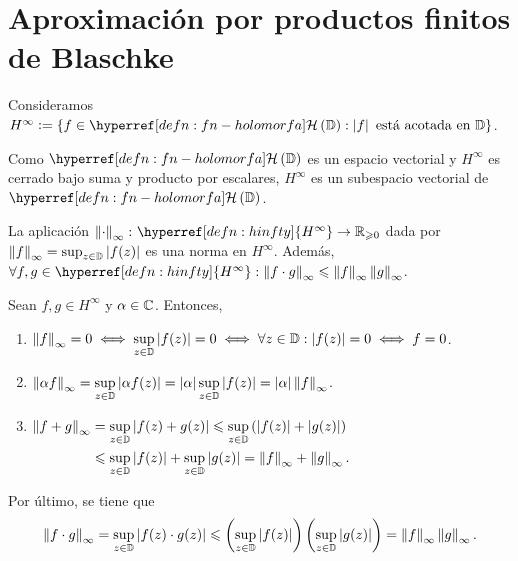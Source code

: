 \chapter{Aproximación por productos finitos de Blaschke}

\begin{defn}\label{defn:hinfty}
    Consideramos $H^{\infty} \defeq \left\{f \in \exhyperref[defn:fn-holomorfa]{fn-holomorfa}{\mathcal{H}} \left(\mathbb{D}\right) : \abs{f} \text{ está acotada en } \mathbb{D}\right\}$.
\end{defn}
Como $\exhyperref[defn:fn-holomorfa]{fn-holomorfa}{\mathcal{H}}\left(\mathbb{D}\right)$ es un espacio vectorial y $\hyperref[defn:hinfty]{H^\infty}$ es cerrado bajo suma y producto por escalares, $\hyperref[defn:hinfty]{H^\infty}$ es un subespacio vectorial de $\exhyperref[defn:fn-holomorfa]{fn-holomorfa}{\mathcal{H}}\left(\mathbb{D}\right)$.

\begin{prop}\label{prop:hinfty-esp-normado}
    La aplicación $\norm{\cdot}_{\infty} \colon \hyperref[defn:hinfty]{H^\infty} \to \R_{\geq 0}$ dada por $\left\Vert f\right\Vert_{\infty} = \sup_{z \in \mathbb{D}} \left|f(z)\right|$ es una norma en $\hyperref[defn:hinfty]{H^\infty}$. Además, $\forall f, g \in \hyperref[defn:hinfty]{H^\infty} : \norm{f \cdot g}_{\infty} \leq \norm{f}_{\infty} \norm{g}_{\infty}$.
\end{prop}
\begin{dem}
    Sean $f, g \in H^\infty$ y $\alpha \in \mathbb{C}$. Entonces,
    \begin{enumerate}[label=(\roman*)]
        \item $\displaystyle \left\Vert f\right\Vert_{\infty} = 0 \iff \sup_{z \in \mathbb{D}} \left|f(z)\right| = 0 \iff \forall z \in \mathbb{D} : \left|f(z)\right| = 0 \iff f = 0$.
        \item $\displaystyle \left\Vert\alpha f\right\Vert_{\infty} = \sup_{z \in \mathbb{D}} \left|\alpha f(z)\right| = \left|\alpha\right| \sup_{z \in \mathbb{D}} \left|f(z)\right| = \left|\alpha\right| \left\Vert f\right\Vert_{\infty}$.
        \item $\begin{aligned}[t]
            \left\Vert f + g\right\Vert_{\infty} &= \sup_{z \in \mathbb{D}} \left|f(z) + g(z)\right| \leqslant \sup_{z \in \mathbb{D}} \left( \left|f(z)\right| + \left|g(z)\right| \right) \\
            &\leqslant \sup_{z \in \mathbb{D}} \left|f(z)\right| + \sup_{z \in \mathbb{D}} \left|g(z)\right| = \left\Vert f\right\Vert_{\infty} + \left\Vert g\right\Vert_{\infty}.
        \end{aligned}$
    \end{enumerate}

    Por último, se tiene que
    \[
        \left\Vert f \cdot g\right\Vert_{\infty} = \sup_{z \in \mathbb{D}} \left|f(z) \cdot g(z)\right| \leqslant \left( \sup_{z \in \mathbb{D}} \left|f(z)\right| \right) \left( \sup_{z \in \mathbb{D}} \left|g(z)\right| \right) = \left\Vert f\right\Vert_{\infty} \left\Vert g\right\Vert_{\infty}.
    \]
    
    \vspace{-\baselineskip}
    \vspace{-\belowdisplayskip}
    \hfill\qedsymbol
\end{dem}

